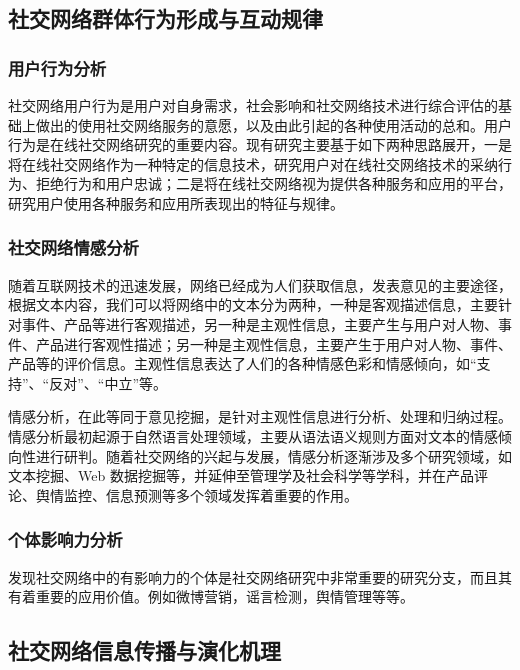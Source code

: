 \documentclass[12pt]{report}
\begin{document}
		\subsection{社交网络群体行为形成与互动规律}
		
			\subsubsection{用户行为分析}
				
				社交网络用户行为是用户对自身需求，社会影响和社交网络技术进行综合评估的基础上做出的使用社交网络服务的意愿，以及由此引起的各种使用活动的总和。用户行为是在线社交网络研究的重要内容。现有研究主要基于如下两种思路展开，一是将在线社交网络作为一种特定的信息技术，研究用户对在线社交网络技术的采纳行为、拒绝行为和用户忠诚；二是将在线社交网络视为提供各种服务和应用的平台，研究用户使用各种服务和应用所表现出的特征与规律。
			
			
			\subsubsection{社交网络情感分析}
			
				随着互联网技术的迅速发展，网络已经成为人们获取信息，发表意见的主要途径，根据文本内容，我们可以将网络中的文本分为两种，一种是客观描述信息，主要针对事件、产品等进行客观描述，另一种是主观性信息，主要产生与用户对人物、事件、产品进行客观性描述；另一种是主观性信息，主要产生于用户对人物、事件、产品等的评价信息。主观性信息表达了人们的各种情感色彩和情感倾向，如“支持”、“反对”、“中立”等。
				
				情感分析，在此等同于意见挖掘，是针对主观性信息进行分析、处理和归纳过程。情感分析最初起源于自然语言处理领域，主要从语法语义规则方面对文本的情感倾向性进行研判。随着社交网络的兴起与发展，情感分析逐渐涉及多个研究领域，如文本挖掘、Web 数据挖掘等，并延伸至管理学及社会科学等学科，并在产品评论、舆情监控、信息预测等多个领域发挥着重要的作用。
			
			\subsubsection{个体影响力分析}
			
				发现社交网络中的有影响力的个体是社交网络研究中非常重要的研究分支，而且其有着重要的应用价值。例如微博营销，谣言检测，舆情管理等等。
			
		\subsection{社交网络信息传播与演化机理}
		
\end{document}
